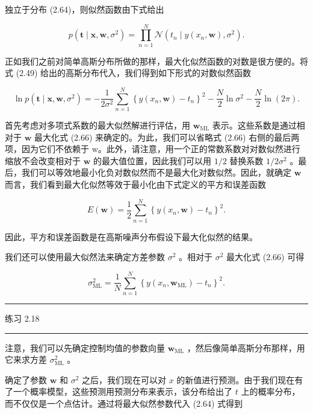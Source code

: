 \documentclass[10pt]{report}
\newcommand{\HRule}{\begin{center}\rule{0.9\linewidth}{0.2mm}\end{center}}
\begin{document}
独立于分布 (2.64)，则似然函数由下式给出

\[
p\left( {\mathbf{t} \mid  \mathbf{x},\mathbf{w},{\sigma }^{2}}\right)  = \mathop{\prod }\limits_{{n = 1}}^{N}\mathcal{N}\left( {{t}_{n} \mid  y\left( {{x}_{n},\mathbf{w}}\right) ,{\sigma }^{2}}\right) . \tag{2.65}
\]

正如我们之前对简单高斯分布所做的那样，最大化似然函数的对数是很方便的。将式 (2.49) 给出的高斯分布代入，我们得到如下形式的对数似然函数

\[
\ln p\left( {\mathbf{t} \mid  \mathbf{x},\mathbf{w},{\sigma }^{2}}\right)  =  - \frac{1}{2{\sigma }^{2}}\mathop{\sum }\limits_{{n = 1}}^{N}{\left\{  y\left( {x}_{n},\mathbf{w}\right)  - {t}_{n}\right\}  }^{2} - \frac{N}{2}\ln {\sigma }^{2} - \frac{N}{2}\ln \left( {2\pi }\right) . \tag{2.66}
\]

首先考虑对多项式系数的最大似然解进行评估，用 \({\mathbf{w}}_{\mathrm{{ML}}}\) 表示。这些系数是通过相对于 \(\mathbf{w}\) 最大化式 (2.66) 来确定的。为此，我们可以省略式 (2.66) 右侧的最后两项，因为它们不依赖于 w。此外，请注意，用一个正的常数系数对对数似然进行缩放不会改变相对于 \(\mathbf{w}\) 的最大值位置，因此我们可以用 \(1/2\) 替换系数 \(1/2{\sigma }^{2}\) 。最后，我们可以等效地最小化负对数似然而不是最大化对数似然。因此，就确定 \(\mathbf{w}\) 而言，我们看到最大化似然等效于最小化由下式定义的平方和误差函数

\[
E\left( \mathbf{w}\right)  = \frac{1}{2}\mathop{\sum }\limits_{{n = 1}}^{N}{\left\{  y\left( {x}_{n},\mathbf{w}\right)  - {t}_{n}\right\}  }^{2}. \tag{2.67}
\]

因此，平方和误差函数是在高斯噪声分布假设下最大化似然的结果。

我们还可以使用最大似然法来确定方差参数 \({\sigma }^{2}\) 。相对于 \({\sigma }^{2}\) 最大化式 (2.66) 可得

\[
{\sigma }_{\mathrm{{ML}}}^{2} = \frac{1}{N}\mathop{\sum }\limits_{{n = 1}}^{N}{\left\{  y\left( {x}_{n},{\mathbf{w}}_{\mathrm{{ML}}}\right)  - {t}_{n}\right\}  }^{2}. \tag{2.68}
\]

\HRule

练习 2.18

\HRule

注意，我们可以先确定控制均值的参数向量 \({\mathbf{w}}_{\mathrm{{ML}}}\) ，然后像简单高斯分布那样，用它来求方差 \({\sigma }_{\mathrm{{ML}}}^{2}\) 。

确定了参数 \(\mathbf{w}\) 和 \({\sigma }^{2}\) 之后，我们现在可以对 \(x\) 的新值进行预测。由于我们现在有了一个概率模型，这些预测用预测分布来表示，该分布给出了 \(t\) 上的概率分布，而不仅仅是一个点估计。通过将最大似然参数代入 (2.64) 式得到
\end{document}
